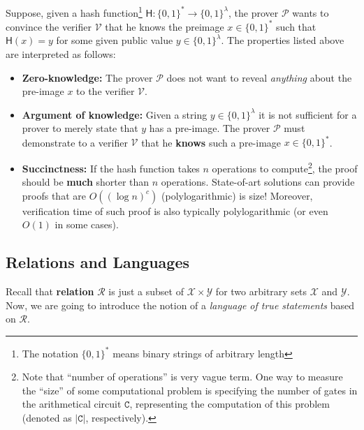 \documentclass[../../book.tex]{subfiles}
\begin{document}
\begin{intuition}
    Suppose, given a hash function\footnote{The notation $\{0,1\}^*$ means
    binary strings of arbitrary length} $\mathsf{H}: \{0,1\}^* \to \{0,1\}^{\lambda}$, the
    prover $\mathcal{P}$ wants to convince the verifier $\mathcal{V}$ that he
    knows the preimage $x \in \{0,1\}^*$ such that $\mathsf{H}(x) = y$ for some given
    public value $y \in \{0,1\}^{\lambda}$. The properties listed above are
    interpreted as follows:
    \begin{itemize}
        \item \textbf{Zero-knowledge:} The prover $\mathcal{P}$ does not want to
        reveal \textit{anything} about the pre-image $x$ to the verifier
        $\mathcal{V}$.
        \item \textbf{Argument of knowledge:} Given a string $y \in
        \{0,1\}^{\lambda}$ it is not sufficient for a prover to merely state that
        $y$ has a pre-image. The prover $\mathcal{P}$ must demonstrate to a
        verifier $\mathcal{V}$ that he \textbf{knows} such a pre-image $x \in
        \{0,1\}^*$.
        \item \textbf{Succinctness:} If the hash function takes $n$ operations
        to compute\footnote{Note that ``number of operations'' is very vague
        term. One way to measure the ``size'' of some computational problem is
        specifying the number of gates in the arithmetical circuit $\mathtt{C}$,
        representing the computation of this problem (denoted as $|\mathtt{C}|$,
        respectively).}, the proof should be \textbf{much} shorter than $n$
        operations. State-of-art solutions can provide proofs that are $O((\log
        n)^c)$ (polylogarithmic) is size! Moreover, verification time of such
        proof is also typically polylogarithmic (or even $O(1)$ in some cases).
    \end{itemize}
\end{intuition}

\subsection{Relations and Languages}\label{section:relations_and_languages}
Recall that \textbf{relation} $\mathcal{R}$ is just a subset of $\mathcal{X}
\times \mathcal{Y}$ for two arbitrary sets $\mathcal{X}$ and $\mathcal{Y}$. Now,
we are going to introduce the notion of a \emph{language of true statements}
based on $\mathcal{R}$.
\end{document}
